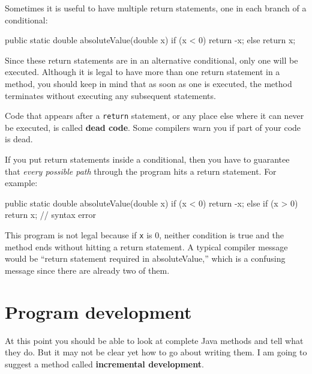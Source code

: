 \documentclass[12pt]{book}
\begin{document}

Sometimes it is useful to have multiple return statements, one in each branch of a conditional:

\begin{code}
    public static double absoluteValue(double x) {
        if (x < 0) {
            return -x;
        } else {
            return x;
        }
    }
\end{code}

Since these return statements are in an alternative conditional, only one will be executed.
Although it is legal to have more than one return statement in a method, you should keep in mind that as soon as one is executed, the method terminates without executing any subsequent statements.


Code that appears after a {\tt return} statement, or any place else where it can never be executed, is called {\bf dead code}.
Some compilers warn you if part of your code is dead.

If you put return statements inside a conditional, then you have to guarantee that {\em every possible path} through the program hits a return statement.
For example:

\begin{code}
    public static double absoluteValue(double x) {
        if (x < 0) {
            return -x;
        } else if (x > 0) {
            return x;
        }
        // syntax error
    }
\end{code}

This program is not legal because if {\tt x} is 0, neither condition is true and the method ends without hitting a return statement.
A typical compiler message would be ``return statement required in absoluteValue,'' which is a confusing message since there are already two of them.


\section{Program development}
\label{distance}


At this point you should be able to look at complete Java methods and tell what they do.
But it may not be clear yet how to go about writing them.
I am going to suggest a method called {\bf incremental development}.
\end{document}
